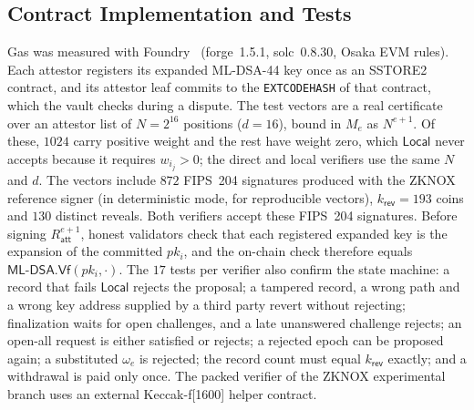 \documentclass[10pt,journal,compsoc]{IEEEtran}
\theoremstyle{tplain}
\theoremstyle{tdef}
\theoremstyle{remark}
\newcommand{\Ratt}{R_{\mathsf{att}}}
\newcommand{\kr}{k_{\mathsf{rev}}}
\newcommand{\mldsa}{\textsf{ML-DSA}}
\begin{document}
\subsection{Contract Implementation and Tests}\label{S-eval-contract}
Gas was measured with Foundry~\cite{foundry} (forge~1.5.1, solc~0.8.30, Osaka EVM rules). Each attestor registers its expanded ML-DSA-44 key once as an SSTORE2 contract, and its attestor leaf commits to the \texttt{EXTCODEHASH} of that contract, which the vault checks during a dispute. The test vectors are a real certificate over an attestor list of $N=2^{16}$ positions ($d=16$), bound in $M_e$ as $N^{e+1}$. Of these, $1024$ carry positive weight and the rest have weight zero, which $\mathsf{Local}$ never accepts because it requires $w_{i_j}>0$; the direct and local verifiers use the same $N$ and $d$. The vectors include $872$ FIPS~204 signatures produced with the ZKNOX reference signer (in deterministic mode, for reproducible vectors), $\kr=193$ coins and $130$ distinct reveals. Both verifiers accept these FIPS~204 signatures. Before signing $\Ratt^{e+1}$, honest validators check that each registered expanded key is the expansion of the committed $pk_i$, and the on-chain check therefore equals $\mldsa.\mathsf{Vf}(pk_i,\cdot)$. The $17$ tests per verifier also confirm the state machine: a record that fails $\mathsf{Local}$ rejects the proposal; a tampered record, a wrong path and a wrong key address supplied by a third party revert without rejecting; finalization waits for open challenges, and a late unanswered challenge rejects; an open-all request is either satisfied or rejects; a rejected epoch can be proposed again; a substituted $\omega_e$ is rejected; the record count must equal $\kr$ exactly; and a withdrawal is paid only once. The packed verifier of the ZKNOX experimental branch uses an external Keccak-f[1600] helper contract.
\end{document}
